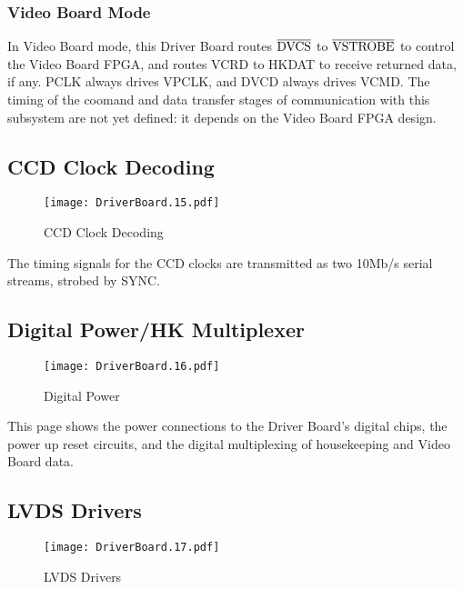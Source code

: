 \documentclass[a4paper,12pt]{article}
\begin{document}
\subsubsection{Video Board Mode}

In Video Board mode, this Driver Board routes $\overline{\textup{DVCS}}$ to $\overline{\textup{VSTROBE}}$ to control the Video Board FPGA, and routes VCRD to HKDAT to receive returned data, if any. PCLK always drives VPCLK, and DVCD always drives VCMD. The timing of the coomand and data transfer stages of communication with this subsystem are not yet defined: it depends on the Video Board FPGA design.


\subsection{CCD Clock Decoding}
   \begin{figure}
   \begin{center}
   \texttt{[image: DriverBoard.15.pdf]}
   \end{center}
   \caption{CCD Clock Decoding}
   \end{figure}
   
The timing signals for the CCD clocks are transmitted as two 10Mb/s serial streams, strobed by SYNC.

\subsection{Digital Power/HK Multiplexer}
   \begin{figure}
   \begin{center}
   \texttt{[image: DriverBoard.16.pdf]}
   \end{center}
   \caption{Digital Power}
   \end{figure}

This page shows the power connections to the Driver Board's digital chips, the power up reset circuits, and the digital multiplexing of housekeeping and Video Board data.

\subsection{LVDS Drivers}
   \begin{figure}
   \begin{center}
   \texttt{[image: DriverBoard.17.pdf]}
   \end{center}
   \caption{LVDS Drivers}
   \end{figure}
 
\end{document}
